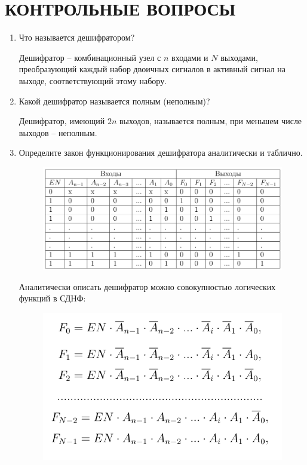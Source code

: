 \chapter*{КОНТРОЛЬНЫЕ ВОПРОСЫ}

\begin{enumerate}
	\item Что называется дешифратором?
	
	Дешифратор -- комбинационный узел с $n$ входами и $N$ выходами, преобразующий каждый набор двоичных сигналов в активный сигнал на выходе, соответствующий этому набору.
	
	\item Какой дешифратор называется полным (неполным)?
	
	Дешифратор, имеющий $2n$ выходов, называется полным, при меньшем числе выходов -- неполным.
	
	\item Определите закон функционирования дешифратора аналитически и таблично.

	\begin{figure}[h]
		\centering
		\includegraphics[width=\linewidth]{img/question3-table}
	\end{figure}

	Аналитически описать дешифратор можно совокупностью логических функций в СДНФ:
	
	\pagebreak

	\begin{figure}[ht]
		\centering
		\includegraphics[width=0.6\linewidth]{img/question3-eq}
	\end{figure}


\end{enumerate}
